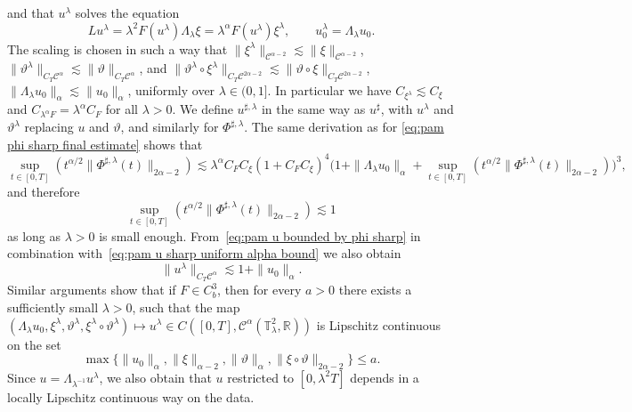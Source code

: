 \documentclass[11pt,a4paper]{article}
\theoremstyle{remark}
\newcommand{\CC}{\ensuremath{\mathscr{C}}}
\begin{document}
and that $u^{\lambda}$ solves the equation
\[
   L u^{\lambda} = \lambda^{2} F ( u^{\lambda} ) \Lambda_{\lambda} \xi = \lambda^{\alpha} F ( u^{\lambda} ) \xi^{\lambda}, \qquad u^\lambda_0 = \Lambda_\lambda u_0.
\]
The scaling is chosen in such a way that $\| \xi^{\lambda} \|_{\CC^{\alpha -2}} \lesssim \| \xi \|_{\CC^{\alpha -2}}$, $\| \vartheta^{\lambda} \|_{C_{T} \CC^\alpha} \lesssim \| \vartheta \|_{C_{T} \CC^\alpha}$, and $\| \vartheta^{\lambda} \circ \xi^{\lambda} \|_{C_{T} \CC^{2 \alpha -2}} \lesssim \| \vartheta \circ \xi \|_{C_{T} \CC^{2 \alpha -2}}$, $\| \Lambda_\lambda u_0 \|_\alpha \lesssim \|u_0\|_\alpha$, uniformly over $\lambda \in (0,1]$. In particular we have $C_{\xi^{\lambda}} \lesssim C_{\xi}$ and
$C_{\lambda^{\alpha} F} = \lambda^{\alpha} C_{F}$ for all $\lambda >0$.
%
We define $u^{\sharp , \lambda}$ in the same way as $u^{\sharp}$, with
$u^{\lambda}$ and $\vartheta^{\lambda}$ replacing $u$ and $\vartheta$, and
similarly for $\Phi^{\sharp , \lambda}$. The same derivation as for
{\eqref{eq:pam phi sharp final estimate}} shows that
\[
   \sup_{t \in [ 0,T ]}  ( t^{\alpha /2} \| \Phi^{\sharp , \lambda} ( t ) \|_{2 \alpha -2} ) \lesssim \lambda^{\alpha} C_{F} C_{\xi} ( 1+C_{F} C_{\xi} )^{4} \Big( 1+ \| \Lambda_{\lambda} u_{0} \|_{\alpha} + \sup_{t \in [ 0,T ]} ( t^{\alpha /2} \| \Phi^{\sharp , \lambda} ( t ) \|_{2 \alpha -2} ) \Big)^{3},
\]
and therefore
\[
   \sup_{t \in [ 0,T ]}  ( t^{\alpha /2} \| \Phi^{\sharp , \lambda} ( t ) \|_{2 \alpha -2} ) \lesssim 1
\]
as long as $\lambda >0$ is small enough. From~\eqref{eq:pam u bounded by phi sharp} in combination with~\eqref{eq:pam u sharp uniform alpha bound} we
also obtain
\[
   \| u^{\lambda} \|_{C_{T} \CC^{\alpha}} \lesssim 1+ \| u_{0} \|_{\alpha}.
\]
Similar arguments show that if $F \in C^{3}_{b}$, then for every $a>0$ there
exists a sufficiently small $\lambda >0$, such that the map $(\Lambda_{\lambda} u_{0} , \xi^{\lambda} , \vartheta^{\lambda} , \xi^{\lambda} \circ \vartheta^{\lambda} ) \mapsto u^{\lambda} \in C ( [ 0,T ] , \CC^{\alpha} ( \mathbb{T}_{\lambda}^{2} ,\mathbb{R} ) )$ is
Lipschitz continuous on the set
\[
   \max \{ \| u_{0} \|_{\alpha} , \| \xi \|_{\alpha -2} , \| \vartheta \|_{\alpha} , \| \xi \circ \vartheta \|_{2 \alpha -2} \} \leqslant a.
\]
Since $u= \Lambda_{\lambda^{-1}} u^{\lambda}$, we also obtain that $u$
restricted to $[ 0, \lambda^{2} T ]$ depends in a locally Lipschitz continuous
way on the data.
\end{document}
